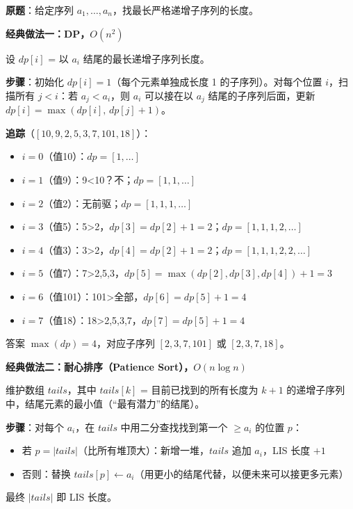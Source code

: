 \documentclass[12pt, a4paper]{ctexart}
\begin{document}
\begin{blackboard}

\textbf{原题}：给定序列 $a_1, \ldots, a_n$，找最长严格递增子序列的长度。

\textbf{经典做法一：DP，$O(n^2)$}

设 $dp[i]$ = 以 $a_i$ 结尾的最长递增子序列长度。

\textbf{步骤}：初始化 $dp[i]=1$（每个元素单独成长度 1 的子序列）。对每个位置 $i$，扫描所有 $j < i$：若 $a_j < a_i$，则 $a_i$ 可以接在以 $a_j$ 结尾的子序列后面，更新 $dp[i] = \max(dp[i],\, dp[j]+1)$。

\textbf{追踪}（$[10,9,2,5,3,7,101,18]$）：
\begin{itemize}
    \item $i=0$（值10）：$dp=[1,\ldots]$
    \item $i=1$（值9）：9<10？不；$dp=[1,1,\ldots]$
    \item $i=2$（值2）：无前驱；$dp=[1,1,1,\ldots]$
    \item $i=3$（值5）：5>2，$dp[3]=dp[2]+1=2$；$dp=[1,1,1,2,\ldots]$
    \item $i=4$（值3）：3>2，$dp[4]=dp[2]+1=2$；$dp=[1,1,1,2,2,\ldots]$
    \item $i=5$（值7）：7>2,5,3，$dp[5]=\max(dp[2],dp[3],dp[4])+1=3$
    \item $i=6$（值101）：101>全部，$dp[6]=dp[5]+1=4$
    \item $i=7$（值18）：18>2,5,3,7，$dp[7]=dp[5]+1=4$
\end{itemize}

答案 $\max(dp)=4$，对应子序列 $[2,3,7,101]$ 或 $[2,3,7,18]$。

\textbf{经典做法二：耐心排序（Patience Sort），$O(n\log n)$}

维护数组 $\textit{tails}$，其中 $\textit{tails}[k]$ = 目前已找到的所有长度为 $k+1$ 的递增子序列中，结尾元素的最小值（``最有潜力''的结尾）。

\textbf{步骤}：对每个 $a_i$，在 $\textit{tails}$ 中用二分查找找到第一个 $\geq a_i$ 的位置 $p$：
\begin{itemize}
    \item 若 $p = |\textit{tails}|$（比所有堆顶大）：新增一堆，$\textit{tails}$ 追加 $a_i$，LIS 长度 $+1$
    \item 否则：替换 $\textit{tails}[p] \leftarrow a_i$（用更小的结尾代替，以便未来可以接更多元素）
\end{itemize}

最终 $|\textit{tails}|$ 即 LIS 长度。


\end{blackboard}
\end{document}
